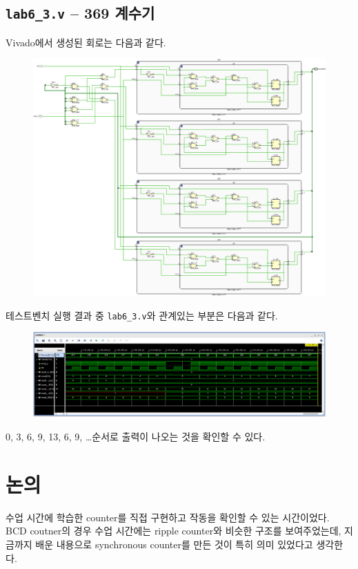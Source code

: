 \documentclass{scrartcl}
\begin{document}
\subsection{\texttt{lab6\_3.v} -- 369 계수기}
Vivado에서 생성된 회로는 다음과 같다.
\begin{figure}[H]
  \centering
  \includegraphics[width=0.9\linewidth]{lab6_3_schematic-crop.pdf}
\end{figure}

테스트벤치 실행 결과 중 \texttt{lab6\_3.v}와 관계있는 부분은 다음과 같다.
\begin{figure}[H]
  \centering
  \includegraphics[width=0.9\linewidth]{lab6_3_waveform.png}
\end{figure}
0, 3, 6, 9, 13, 6, 9, \dots 순서로 출력이 나오는 것을 확인할 수 있다.

\section{논의}
수업 시간에 학습한 counter를 직접 구현하고 작동을 확인할 수 있는 시간이었다.
BCD coutner의 경우 수업 시간에는 ripple counter와 비슷한 구조를 보여주었는데, 지금까지 배운 내용으로 synchronous counter를 만든 것이 특히 의미 있었다고 생각한다.
\end{document}
